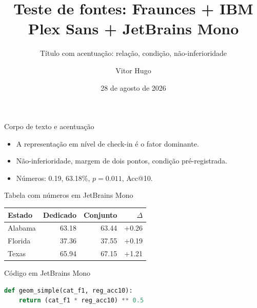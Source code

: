 \documentclass{beamer}
\title[Teste]{Teste de fontes: Fraunces + IBM Plex Sans + JetBrains Mono}
\subtitle{Título com acentuação: relação, condição, não-inferioridade}
\author{Vitor Hugo}
\institute[UFV]{Universidade Federal de Viçosa --- PPGCC}
\date{28 de agosto de 2026}
\begin{document}

\begin{frame}{Corpo de texto e acentuação}
    \begin{itemize}
        \item A representação em nível de check-in é o fator dominante.
        \item Não-inferioridade, margem de dois pontos, condição pré-registrada.
        \item Números: 0.19, 63.18\%, $p=0.011$, Acc@10.
    \end{itemize}
\end{frame}

\begin{frame}{Tabela com números em JetBrains Mono}
    \begin{table}
        \centering
        {\codefont
        \begin{tabular}{lrrr}
            Estado & Dedicado & Conjunto & $\Delta$ \\\hline
            Alabama & 63.18 & 63.44 & +0.26 \\
            Florida & 37.36 & 37.55 & +0.19 \\
            Texas   & 65.94 & 67.15 & +1.21 \\
        \end{tabular}}
    \end{table}
\end{frame}

\begin{frame}[fragile]{Código em JetBrains Mono}
    \begin{lstlisting}[language=Python]
def geom_simple(cat_f1, reg_acc10):
    return (cat_f1 * reg_acc10) ** 0.5
    \end{lstlisting}
\end{frame}
\end{document}
